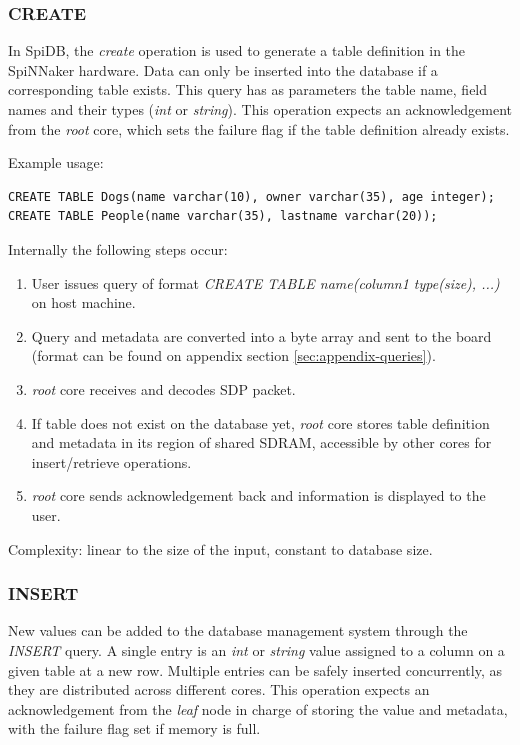 \subsubsection{CREATE}
In SpiDB, the \textit{create} operation is used to generate a table definition in the SpiNNaker hardware. Data can only be inserted into the database if a corresponding table exists. This query has as parameters the table name, field names and their types (\textit{int} or \textit{string}).
This operation expects an acknowledgement from the \textit{root} core, which sets the failure flag if the table definition already exists.

Example usage:
\begin{lstlisting}
CREATE TABLE Dogs(name varchar(10), owner varchar(35), age integer);
CREATE TABLE People(name varchar(35), lastname varchar(20));
\end{lstlisting}

Internally the following steps occur:
\begin{enumerate}
\item User issues query of format \textit{CREATE TABLE name(column1 type(size), ...)} on host machine.
\item Query and metadata are converted into a byte array and sent to the board (format can be found on appendix section \ref{sec:appendix-queries}).
\item \textit{root} core receives and decodes SDP packet.
\item If table does not exist on the database yet, \textit{root} core stores table definition and metadata in its region of shared SDRAM, accessible by other cores for insert/retrieve operations. 
\item \textit{root} core sends acknowledgement back and information is displayed to the user.
\end{enumerate}

Complexity: linear to the size of the input, constant to database size.
   
\subsubsection{INSERT}
New values can be added to the database management system through the \textit{INSERT} query. A single entry is an \textit{int} or \textit{string} value assigned to a column on a given table at a new row. Multiple entries can be safely inserted concurrently, as they are distributed across different cores. This operation expects an acknowledgement from the \textit{leaf} node in charge of storing the value and metadata, with the failure flag set if memory is full.

